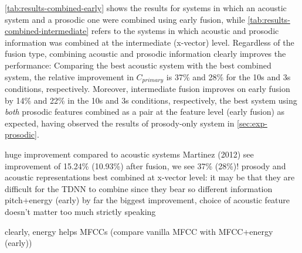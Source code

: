 \documentclass[bsc,frontabs,twoside,singlespacing,parskip,deptreport]{infthesis}
\begin{document}
{{    \autoref{tab:results-combined-early} shows the results for systems in which an acoustic system and a prosodic one were combined using early fusion, while \autoref{tab:results-combined-intermediate} refers to the systems in which acoustic and prosodic information was combined at the intermediate (x-vector) level. Regardless of the fusion type, combining acoustic and prosodic information clearly improves the performance: Comparing the best acoustic system with the best combined system, the relative improvement in $C_{primary}$ is 37\% and 28\% for the 10s and 3s conditions, respectively. Moreover, intermediate fusion improves on early fusion by 14\% and 22\% in the 10s and 3s conditions, respectively, the best system using \textit{both} prosodic features combined as a pair at the feature level (early fusion) as expected, having observed the results of prosody-only system in \autoref{sec:exp-prosodic}.


    huge improvement compared to acoustic systems
    Martinez (2012) see improvement of 15.24\% (10.93\%) after fusion, we see 37\% (28\%)!
    prosody and acoustic representations best combined at x-vector level: it may be that they are difficult for the TDNN to combine since they bear so different information
    pitch+energy (early) by far the biggest improvement, choice of acoustic feature doesn't matter too much strictly speaking

    clearly, energy helps MFCCs (compare vanilla MFCC with MFCC+energy (early))
  }
}
\end{document}
